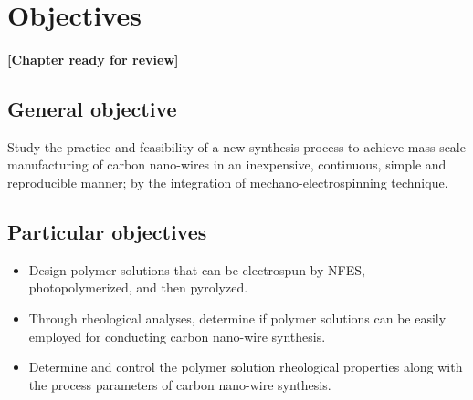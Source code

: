 
\chapter{Objectives} %

\label{Chapter:Objectives}

\subsubsection*{\color{mygray}[Chapter ready for review]}

\section{General objective}
Study the practice and feasibility of a new synthesis process to achieve mass scale manufacturing of carbon nano-wires in an inexpensive, continuous, simple and reproducible manner; by the integration of mechano-electrospinning technique.

\section{Particular objectives}

\begin{itemize}
	\item{
	Design polymer solutions that can be electrospun by NFES, photopolymerized, and then pyrolyzed.
    }
    \item{
    Through rheological analyses, determine if polymer solutions can be easily employed for conducting carbon nano-wire synthesis.
    }
    \item{
    Determine and control the polymer solution rheological properties along with the process parameters of carbon nano-wire synthesis.
    }
\end{itemize}




